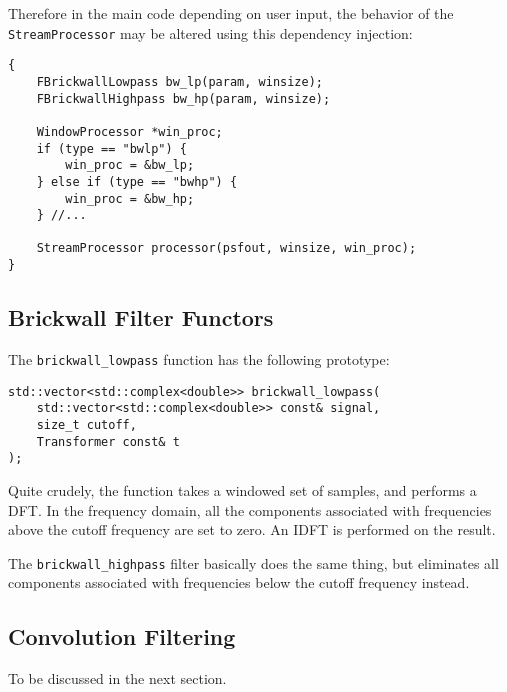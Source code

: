 Therefore in the main code depending on user input, the behavior of the \verb|StreamProcessor|
may be altered using this dependency injection:

\begin{verbatim}
{
    FBrickwallLowpass bw_lp(param, winsize);
    FBrickwallHighpass bw_hp(param, winsize);

    WindowProcessor *win_proc;
    if (type == "bwlp") {
        win_proc = &bw_lp;
    } else if (type == "bwhp") {
        win_proc = &bw_hp;
    } //...

    StreamProcessor processor(psfout, winsize, win_proc);
}
\end{verbatim}

\subsection{Brickwall Filter Functors}
The \verb|brickwall_lowpass| function has the following prototype:

\begin{verbatim}
std::vector<std::complex<double>> brickwall_lowpass(
    std::vector<std::complex<double>> const& signal,
    size_t cutoff,
    Transformer const& t
);
\end{verbatim}

Quite crudely, the function takes a windowed set of samples, and performs a DFT.
In the frequency domain, all the components associated with frequencies above 
the cutoff frequency are set to zero.
An IDFT is performed on the result.

The \verb|brickwall_highpass| filter basically does the same thing, 
but eliminates all components associated with frequencies below the cutoff frequency instead.

\subsection{Convolution Filtering}
To be discussed in the next section.